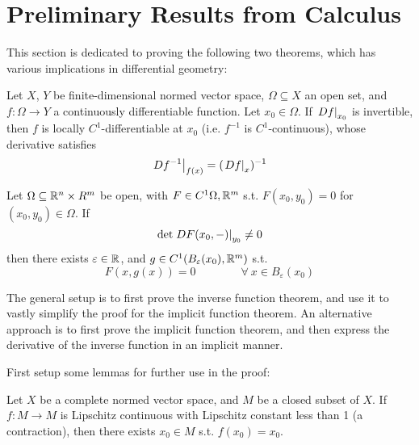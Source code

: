 \documentclass{article}
\begin{document}

\tableofcontents
\newpage

\def\open{\mathcal{O}}

\section{Preliminary Results from Calculus}

This section is dedicated to proving the following two theorems, which has various implications in differential geometry:

\begin{theorem}\label{thm:inverse function theorem}
    Let $X$, $Y$ be finite-dimensional normed vector space, $\Omega \subseteq X$ an open set, and $f: \Omega \to Y$ a continuously differentiable function. Let $x_0 \in \Omega$. If $\left.Df\right|_{x_0}$ is invertible, then $f$ is locally $C^{1}$-differentiable at $x_0$ (i.e. $f^{-1}$ is $C^1$-continuous), whose derivative satisfies
    \[
        \left.Df^{-1}\right|_{f(x)} = (\left.Df\right|_{x})^{-1}
    \]
\end{theorem}

\begin{theorem}\label{thm:implicit function theorem}
    Let $\Omega \subseteq \mathbb{R}^n \times R^m$ be open, with $F \in C^1{\Omega, \mathbb{R}^m}$ s.t. $F(x_0, y_0) = 0$ for $(x_0, y_0) \in \Omega$. If
    \[
        \det \left.DF(x_0, -)\right|_{y_0} \neq 0
    \]
    then there exists $\varepsilon \in \mathbb{R}$, and $g \in C^1(B_{\varepsilon}(x_0), \mathbb{R}^m)$ s.t.
    \[
        F(x, g(x)) = 0 \qquad \qquad \forall \ x \in B_{\varepsilon}(x_0)
    \]
\end{theorem}

The general setup is to first prove the inverse function theorem, and use it to vastly simplify the proof for the implicit function theorem. An alternative approach is to first prove the implicit function theorem, and then express the derivative of the inverse function in an implicit manner. 

First setup some lemmas for further use in the proof:

\begin{lemma}\label{lem: contraction mapping principle}
    Let $X$ be a complete normed vector space, and $M$ be a closed subset of $X$. If $f: M \to M$ is Lipschitz continuous with Lipschitz constant less than 1 (a contraction), then there exists $x_0 \in M$ s.t. $f(x_0) = x_0$.
\end{lemma}
\end{document}
